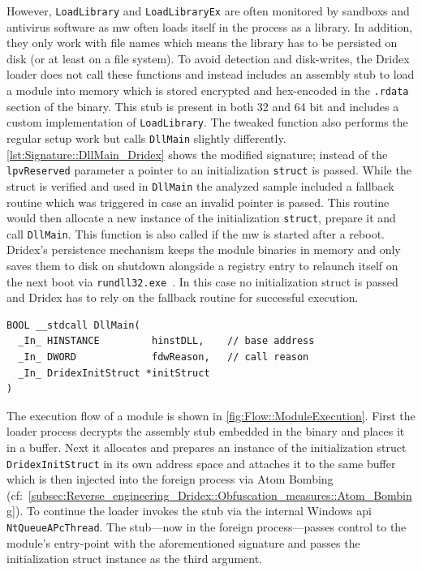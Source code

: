 However, \lstinline|LoadLibrary| and \lstinline|LoadLibraryEx| are often monitored by \glspl{sandbox} and antivirus software as \gls{mw} often loads itself in the process as a library.
In addition, they only work with file names which means the library has to be persisted on disk (or at least on a file system).
To avoid detection and disk-writes, the Dridex loader does not call these functions and instead includes an assembly stub to load a module into memory which is stored encrypted and hex-encoded in the \lstinline|.rdata| section of the binary.
This stub is present in both 32 and 64 bit and includes a custom implementation of \lstinline|LoadLibrary|.
The tweaked function also performs the regular setup work but calls \lstinline|DllMain| slightly differently. 
\autoref{lst:Signature::DllMain_Dridex} shows the modified signature; instead of the \lstinline|lpvReserved| parameter a pointer to an initialization \lstinline|struct| is passed.
While the struct is verified and used in \lstinline|DllMain| the analyzed sample included a fallback routine which was triggered in case an invalid pointer is passed.
This routine would then allocate a new instance of the initialization \lstinline|struct|, prepare it and call \lstinline|DllMain|.
This function is also called if the \gls{mw} is started after a reboot.
Dridex's persistence mechanism keeps the module binaries in memory and only saves them to disk on shutdown alongside a registry entry to relaunch itself on the next boot via \lstinline|rundll32.exe|~\cite{bogdan2015dridex}.
In this case no initialization struct is passed and Dridex has to rely on the fallback routine for successful execution.
\\

\begin{lstlisting}[style=win, caption={Signature of \texttt{DllMain} in Dridex modules}, label={lst:Signature::DllMain_Dridex}]
BOOL __stdcall DllMain(
  _In_ HINSTANCE         hinstDLL,    // base address
  _In_ DWORD             fdwReason,   // call reason
  _In_ DridexInitStruct *initStruct
)
\end{lstlisting}

The execution flow of a module is shown in \autoref{fig:Flow::ModuleExecution}.
First the loader process decrypts the assembly stub embedded in the binary and places it in a buffer.
Next it allocates and prepares an instance of the initialization struct \lstinline|DridexInitStruct| in its own address space and attaches it to the same buffer which is then injected into the foreign process via Atom Bombing (cf:~\autoref{subsec:Reverse_engineering_Dridex::Obfuscation_measures::Atom_Bombing}).
To continue the loader invokes the stub via the internal Windows \gls{api} \lstinline|NtQueueAPcThread|.
The stub---now in the foreign process---passes control to the module's entry-point with the aforementioned signature and passes the initialization struct instance as the third argument.

